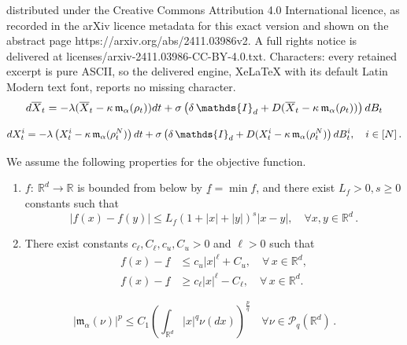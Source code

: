 \documentclass[10pt,a4paper]{amsart}
\newcommand{\OX}{{\overline{X}}}
\newcommand{\RR}{{\mathbb R}}
\newcommand{\dt}{{\rm d} t}
\newcommand{\rd}{{\rm d} }
\begin{document}
distributed under the Creative Commons Attribution 4.0 International licence, as recorded in the arXiv licence metadata for this exact version and shown on the abstract page https://arxiv.org/abs/2411.03986v2. A full rights notice is delivered at licenses/arxiv-2411.03986-CC-BY-4.0.txt. Characters: every retained excerpt is pure ASCII, so the delivered engine, XeLaTeX with its default Latin Modern text font, reports no missing character.
\begin{equation}\label{CBO kappa}
    \rd \OX_t =-\lambda(\OX_t - \kappa\,\mathfrak{m}_{\alpha}(\rho_t))\dt+\sigma\left(\delta\,\mathds{I}_{d} + D(\OX_t - \kappa\, \mathfrak{m}_{\alpha}(\rho_t)) \right)\rd B_t
\end{equation}

 \begin{equation}\label{CBOkappa particle}
\rd X_t^i =-\lambda \left(X_t^i - \kappa\,\mathfrak{m}_{\alpha}(\rho_t^N) \right) \dt+\sigma\left(\delta\,\mathds{I}_{d} + D(X_t^i - \kappa\, \mathfrak{m}_{\alpha}(\rho_t^N) \right)\rd B_t^i,\quad i\in [N]\,.
\end{equation}

\begin{assum}\label{assum1}
	We assume the following properties for the objective function.%
	\begin{enumerate}
		\item $f:~\RR^d\to \RR$ is bounded from below by $\underline f=\min f$, and there exist $L_{f}>0, s\geq 0$ constants such that
		\begin{equation*}
			|f(x)-f(y)|\leq L_f(1+|x|+|y|)^s|x-y|, \quad \forall x,y\in \RR^d\,.
		\end{equation*} 
		\item There exist constants $c_\ell,C_\ell, c_u, C_u>0$  and $\ell>0$ such that
        \begin{equation*}
        \begin{aligned}
			f(x) -\underline f & \leq c_u|x|^\ell+C_u,\quad \forall\, x\in \RR^d,\\
            f(x) -\underline f	& \geq c_\ell |x|^\ell-C_\ell,\quad \forall\, x\in \RR^d.
        \end{aligned}
		\end{equation*}
	\end{enumerate}
\end{assum}

\begin{equation}\label{lemeq2}
    |\mathfrak{m}_{\alpha}(\nu)|^p\leq C_1\left(\int_{\RR^d}|x|^q\nu(dx)\right)^{\frac{p}{q}}\quad \forall \nu\in \mathscr{P}_q(\RR^d)\,.
\end{equation}
\end{document}
